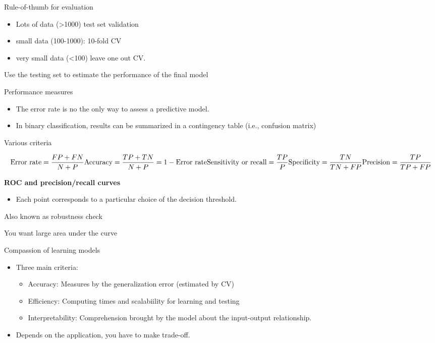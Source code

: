 \documentclass[
]{book}
\providecommand{\tightlist}{%
  \setlength{\itemsep}{0pt}\setlength{\parskip}{0pt}}
\begin{document}
Rule-of-thumb for evaluation

\begin{itemize}
\tightlist
\item
  Lots of data (\textgreater1000) test set validation
\item
  small data (100-1000): 10-fold CV
\item
  very small data (\textless100) leave one out CV.
\end{itemize}

Use the testing set to estimate the performance of the final model

Performance measures

\begin{itemize}
\tightlist
\item
  The error rate is no the only way to assess a predictive model.
\item
  In binary classification, results can be summarized in a contingency table (i.e., confusion matrix)
\end{itemize}

Various criteria

\[
\text{Error rate} = \frac{FP + FN}{N + P} \\
\text{Accuracy} = \frac{TP + TN}{N + P} = 1 - \text{Error rate} \\
\text{Sensitivity or recall} = \frac{TP}{P} \\
\text{Specificity} = \frac{TN}{TN + FP} \\
\text{Precision} = \frac{TP}{TP + FP} \\
\]

\textbf{ROC and precision/recall curves}

\begin{itemize}
\tightlist
\item
  Each point corresponds to a particular choice of the decision threshold.
\end{itemize}

Also known as robustness check

You want large area under the curve

Compassion of learning models

\begin{itemize}
\item
  Three main criteria:

  \begin{itemize}
  \tightlist
  \item
    Accuracy: Measures by the generalization error (estimated by CV)\\
  \item
    Efficiency: Computing times and scalabiility for learning and testing\\
  \item
    Interpretability: Comprehension brought by the model about the input-output relationship.\\
  \end{itemize}
\item
  Depends on the application, you have to make trade-off.
\end{itemize}
\end{document}
